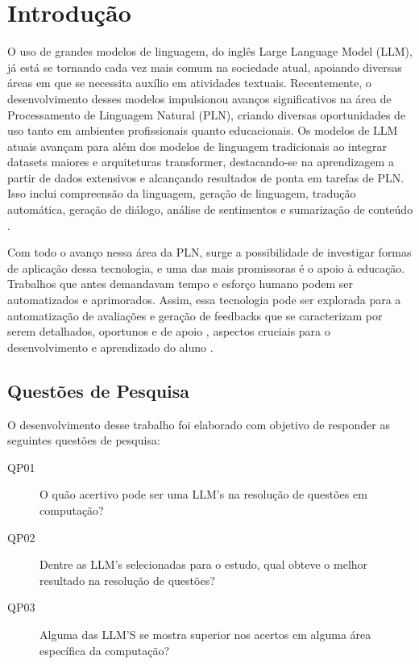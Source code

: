 \chapter{Introdução}\label{cap1}

O uso de grandes modelos de linguagem, do inglês Large Language Model (LLM), já está se tornando cada vez mais comum na sociedade atual, apoiando diversas áreas em que se necessita auxílio em atividades textuais. Recentemente, o desenvolvimento desses modelos impulsionou avanços significativos na área de Processamento de Linguagem Natural (PLN), criando diversas oportunidades de uso tanto em ambientes profissionais quanto educacionais. Os modelos de LLM atuais avançam para além dos modelos de linguagem tradicionais ao integrar datasets maiores e arquiteturas transformer, destacando-se na aprendizagem a partir de dados extensivos e alcançando resultados de ponta em tarefas de PLN. Isso inclui compreensão da linguagem, geração de linguagem, tradução automática, geração de diálogo, análise de sentimentos e sumarização de conteúdo \cite{mohamed2024hands}.

Com todo o avanço nessa área da PLN, surge a possibilidade de investigar formas de aplicação dessa tecnologia, e uma das mais promissoras é o apoio à educação. Trabalhos que antes demandavam tempo e esforço humano podem ser automatizados e aprimorados. Assim, essa tecnologia pode ser explorada para a automatização de avaliações e geração de feedbacks  que se caracterizam por serem detalhados, oportunos e de apoio , aspectos cruciais para o desenvolvimento e aprendizado do aluno \cite{liew2024automated}.

\section{Questões de Pesquisa}

O desenvolvimento desse trabalho foi elaborado com objetivo de responder as seguintes questões de pesquisa:

\begin{description}
    \item[QP01] O quão acertivo pode ser uma LLM's na resolução de questões em computação?
    \item[QP02] Dentre as LLM's selecionadas para o estudo, qual obteve o melhor resultado na resolução de questões?
    \item[QP03] Alguma das LLM'S se mostra superior nos acertos em alguma área específica da computação?
\end{description}

